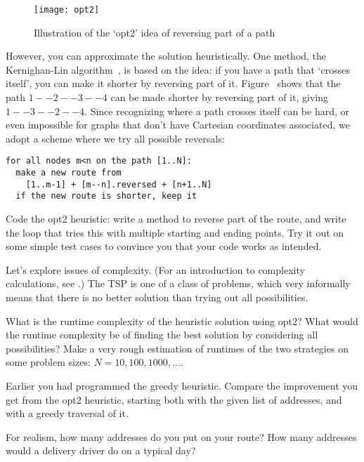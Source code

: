 \begin{figure}[ht]
  \texttt{[image: opt2]}
  \caption{Illustration of the `opt2' idea of reversing part of a
    path}
  \label{fig:opt2}
\end{figure}

However, you can approximate the solution heuristically. One method,
the Kernighan-Lin algorithm~\cite{KL:TSP}, is based on the
 idea: if you have a path that `crosses itself', you
can make it shorter by reversing part of it. Figure~
shows that the path $1--2--3--4$ can be made shorter by reversing part
of it, giving $1--3--2--4$. Since recognizing where a path crosses
itself can be hard, or even impossible for graphs that don't have
Cartesian coordinates associated, we adopt a scheme
where we try all possible reversals:
\begin{verbatim}
for all nodes m<n on the path [1..N]:
  make a new route from
    [1..m-1] + [m--n].reversed + [n+1..N]
  if the new route is shorter, keep it
\end{verbatim}

\begin{exercise}
  Code the opt2 heuristic: write a method to reverse part of the
  route, and write the loop that tries this with multiple starting and
  ending points. Try it out on some simple test cases to convince you
  that your code works as intended.
\end{exercise}

Let's explore issues of complexity.
(For an introduction to complexity calculations,
see .)
The \ac{TSP} is one of a class of  problems,
which very informally means that there is no better solution than
trying out all possibilities. 

\begin{exercise}
  What is the runtime complexity of the heuristic solution using opt2?
  What would the runtime complexity be of finding the best solution
  by considering all possibilities?
  Make a very rough estimation of runtimes of the two strategies
  on some problem sizes: $N=10,100,1000,\ldots$.
\end{exercise}

\begin{exercise}
  Earlier you had programmed the greedy heuristic. Compare the
  improvement you get from the opt2 heuristic, starting both with the
  given list of addresses, and with a greedy traversal of it.

  For realism, how many addresses do you put on your route?
  How many addresses would a delivery driver do on a typical day?
\end{exercise}

